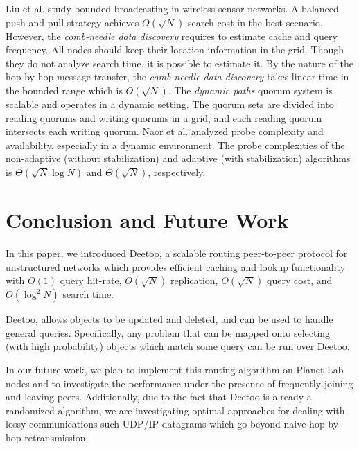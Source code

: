 \documentclass[conference]{IEEEtran}
\begin{document}
Liu et al. \cite{LiuHZ04} study bounded broadcasting in wireless sensor networks. 
A balanced push and pull strategy achieves $O(\sqrt N)$ search 
cost in the best scenario. However, the \emph{comb-needle data discovery}  
requires to estimate cache and query frequency.
All nodes should keep their location information in the grid. 
Though they do not analyze search time, it is possible to estimate it. By the
nature of the hop-by-hop message transfer, the \emph{comb-needle data discovery} 
takes linear time in the bounded range which is $O(\sqrt N)$. 
The \emph{dynamic paths} quorum system\cite{Naor05} 
is scalable and operates in a dynamic setting. The quorum sets are 
divided into reading quorums and writing quorums in a grid, and each 
reading quorum intersects each writing quorum. Naor et al. analyzed probe 
complexity and availability, especially in a dynamic environment. 
The probe complexities of the non-adaptive (without stabilization)
and adaptive (with stabilization) algorithms is 
$\Theta(\sqrt N \log N)$ and $\Theta(\sqrt N)$, respectively. 

\section{Conclusion and Future Work}
\label{sec:conclusion}
In this paper, we introduced Deetoo, a scalable routing peer-to-peer
protocol for unstructured networks which provides efficient caching
and lookup functionality with $O(1)$ query hit-rate, $O(\sqrt N)$
replication, $O(\sqrt{N})$ query cost, and $O(\log^2 N)$ search time.

Deetoo, allows objects to be updated and deleted, and can
be used to handle general queries.  Specifically, any problem
that can be mapped onto selecting (with high probability) objects
which match some query can be run over Deetoo.

In our future work, we plan to implement this routing algorithm
on Planet-Lab nodes and to investigate the performance under the presence
of frequently joining and leaving peers.  Additionally, due to the
fact that Deetoo is already a randomized algorithm, we are
investigating optimal approaches for dealing with lossy communications
such UDP/IP datagrams which go beyond naive hop-by-hop retransmission.



\end{document}
